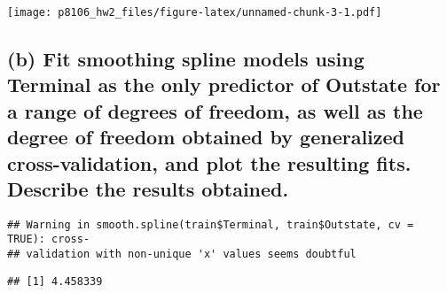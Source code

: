 \documentclass[
]{article}
\newenvironment{Shaded}{\begin{snugshade}}{\end{snugshade}}
\newcommand{\AttributeTok}[1]{\textcolor[rgb]{0.77,0.63,0.00}{#1}}
\newcommand{\ConstantTok}[1]{\textcolor[rgb]{0.00,0.00,0.00}{#1}}
\newcommand{\FunctionTok}[1]{\textcolor[rgb]{0.00,0.00,0.00}{#1}}
\newcommand{\NormalTok}[1]{#1}
\newcommand{\OtherTok}[1]{\textcolor[rgb]{0.56,0.35,0.01}{#1}}
\newcommand{\SpecialCharTok}[1]{\textcolor[rgb]{0.00,0.00,0.00}{#1}}
\begin{document}
\texttt{[image: p8106\_hw2\_files/figure-latex/unnamed-chunk-3-1.pdf]}

\hypertarget{b-fit-smoothing-spline-models-using-terminal-as-the-only-predictor-of-outstate-for-a-range-of-degrees-of-freedom-as-well-as-the-degree-of-freedom-obtained-by-generalized-cross-validation-and-plot-the-resulting-fits.-describe-the-results-obtained.}{%
\subsection{(b) Fit smoothing spline models using Terminal as the only
predictor of Outstate for a range of degrees of freedom, as well as the
degree of freedom obtained by generalized cross-validation, and plot the
resulting fits. Describe the results
obtained.}\label{b-fit-smoothing-spline-models-using-terminal-as-the-only-predictor-of-outstate-for-a-range-of-degrees-of-freedom-as-well-as-the-degree-of-freedom-obtained-by-generalized-cross-validation-and-plot-the-resulting-fits.-describe-the-results-obtained.}}

\begin{Shaded}
\end{Shaded}

\begin{verbatim}
## Warning in smooth.spline(train$Terminal, train$Outstate, cv = TRUE): cross-
## validation with non-unique 'x' values seems doubtful
\end{verbatim}

\begin{Shaded}
\end{Shaded}

\begin{verbatim}
## [1] 4.458339
\end{verbatim}
\end{document}
